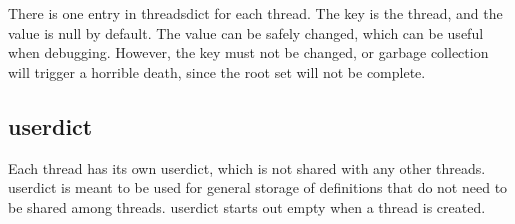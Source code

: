 There is one entry in threadsdict for each thread.  The key is the thread, and
the value is null by default.  The value can be safely changed, which can be
useful when debugging.  However, the key must not be changed, or garbage
collection will trigger a horrible death, since the root set will not be
complete.

\subsection{userdict}
\label{sec:userdict}

Each thread has its own userdict, which is not shared with any other threads.
userdict is meant to be used for general storage of definitions that do not need
to be shared among threads.  userdict starts out empty when a thread is
created.
